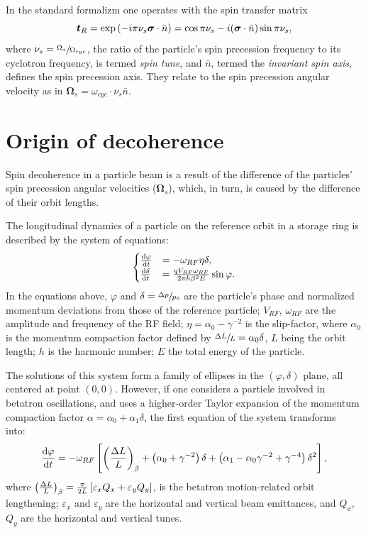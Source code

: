 \documentclass[a4paper]{jacow}
\renewcommand{\vec}{\boldsymbol}
\newcommand{\w}{\omega}
\newcommand{\W}{\Omega}
\begin{document}
In the standard formalizm one operates with the spin transfer matrix~\cite[p.~4]{COSY:SpinTuneMapping}
\[
\boldsymbol{t}_R = \exp\bkt{-i\pi\nu_s\vec\sigma\cdot\bar n} = \cos\pi\nu_s - i (\vec\sigma\cdot\bar n)\sin\pi\nu_s,
\]
where $\nu_s = \sfrac{\W_s}{\W_{cyc}}$, the ratio of the particle's spin precession frequency to its cyclotron frequency, is termed \emph{spin tune}, and $\bar n$, termed the \emph{invariant spin axis}, defines the spin precession axis. They relate to the spin precession angular velocity as in $\vec\W_s = \w_{cyc}\cdot \nu_s\bar n$.

\section{Origin of decoherence}
Spin decoherence in a particle beam is a result of the difference of the particles' spin precession angular velocities ($\vec\W_s$), which, in turn, is caused by the difference of their orbit lengths.

The longitudinal dynamics of a particle on the reference orbit in a storage ring is described by the system of equations:
\begin{equation}
  \begin{cases}
    \ddt{\varphi} &= -\w_{RF}\eta\delta, \\
    \ddt{\delta} &= \frac{q V_{RF}\w_{RF}}{2\pi h\beta^2E}\sin\varphi.
  \end{cases}
\end{equation}
In the equations above, $\varphi$ and  $\delta = \sfrac{\Delta p}{p_0}$ are the particle's phase and normalized momentum deviations from those of the reference particle; $V_{RF}$, $\w_{RF}$ are the amplitude and frequency of the RF field; $\eta = \alpha_0 - \gamma^{-2}$ is the slip-factor, where $\alpha_0$ is the momentum compaction factor defined by $\sfrac{\Delta L}{L} = \alpha_0\delta$, $L$ being the orbit length; $h$ is the harmonic number; $E$ the total energy of the particle.

The solutions of this system form a family of ellipses in the $(\varphi, \delta)$ plane, all centered at point $(0,0)$. However, if one considers a particle involved in betatron oscillations, and uses a higher-order Taylor expansion of the momentum compaction factor $\alpha = \alpha_0 + \alpha_1\delta$, the first equation of the system transforms into:~\cite[p.~2579]{Senichev:IPAC13}
\[
\ddt{\varphi} = -\w_{RF} \bkt*{\bkt{\frac{\Delta L}{L}}_\beta + \bkt{\alpha_0 + \gamma^{-2}}\delta + \bkt{\alpha_1 - \alpha_0\gamma^{-2} + \gamma^{-4}}\delta^2},
\]
where $\bkt{\frac{\Delta L}{L}}_\beta = \frac{\pi}{2L}\bkt*{\varepsilon_xQ_x + \varepsilon_yQ_y}$, is the betatron motion-related orbit lengthening; $\varepsilon_x$ and $\varepsilon_y$ are the horizontal and vertical beam emittances, and $Q_x$, $Q_y$ are the horizontal and vertical tunes.
\end{document}
